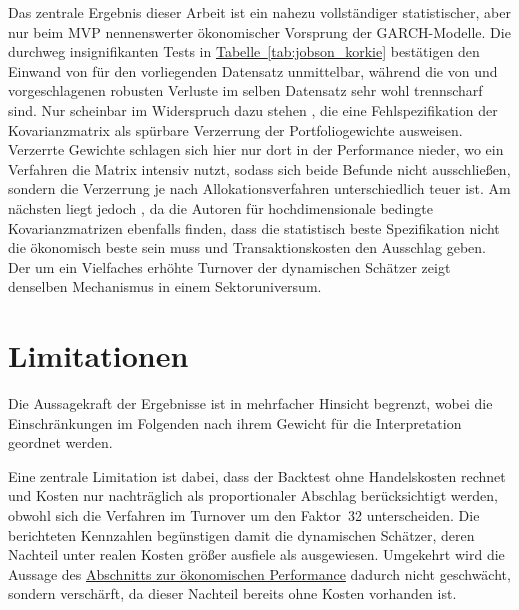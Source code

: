 \documentclass[12pt,a4paper]{article}
\begin{document}
Das zentrale Ergebnis dieser Arbeit ist ein nahezu vollständiger statistischer, aber nur beim MVP nennenswerter ökonomischer Vorsprung der GARCH-Modelle.
Die durchweg insignifikanten Tests in \hyperref[tab:jobson_korkie]{Tabelle~\ref*{tab:jobson_korkie}} bestätigen den Einwand von \textcite{engle2006} für den vorliegenden Datensatz unmittelbar, während die von \textcite{patton2011} und \textcite{laurent2013} vorgeschlagenen robusten Verluste im selben Datensatz sehr wohl trennscharf sind.
Nur scheinbar im Widerspruch dazu stehen \textcite{ardia2017}, die eine Fehlspezifikation der Kovarianzmatrix als spürbare Verzerrung der Portfoliogewichte ausweisen.
Verzerrte Gewichte schlagen sich hier nur dort in der Performance nieder, wo ein Verfahren die Matrix intensiv nutzt, sodass sich beide Befunde nicht ausschließen, sondern die Verzerrung je nach Allokationsverfahren unterschiedlich teuer ist.
Am nächsten liegt jedoch \textcite{moura2020}, da die Autoren für hochdimensionale bedingte Kovarianzmatrizen ebenfalls finden, dass die statistisch beste Spezifikation nicht die ökonomisch beste sein muss und Transaktionskosten den Ausschlag geben.
Der um ein Vielfaches erhöhte Turnover der dynamischen Schätzer zeigt denselben Mechanismus in einem Sektoruniversum.

\fi
\section{Limitationen}\label{sec:limitationen}
\iffalse
Die Aussagekraft der Ergebnisse ist in mehrfacher Hinsicht begrenzt, wobei die Einschränkungen im Folgenden nach ihrem Gewicht für die Interpretation geordnet werden.

Eine zentrale Limitation ist dabei, dass der Backtest ohne Handelskosten rechnet und Kosten nur nachträglich als proportionaler Abschlag berücksichtigt werden, obwohl sich die Verfahren im Turnover um den Faktor~32 unterscheiden.
Die berichteten Kennzahlen begünstigen damit die dynamischen Schätzer, deren Nachteil unter realen Kosten größer ausfiele als ausgewiesen.
Umgekehrt wird die Aussage des \hyperref[sec:oekonomisch]{Abschnitts zur ökonomischen Performance} dadurch nicht geschwächt, sondern verschärft, da dieser Nachteil bereits ohne Kosten vorhanden ist.
\end{document}
